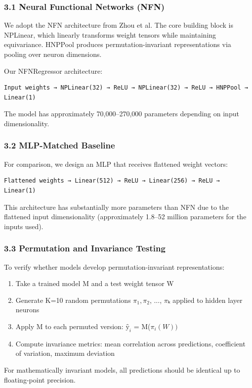 
\subsubsection{3.1 Neural Functional Networks (NFN)}

We adopt the NFN architecture from Zhou et al. The core building block is NPLinear, which linearly transforms weight tensors while maintaining equivariance. HNPPool produces permutation-invariant representations via pooling over neuron dimensions.

Our NFNRegressor architecture:
\begin{verbatim}
Input weights → NPLinear(32) → ReLU → NPLinear(32) → ReLU → HNPPool → Linear(1)
\end{verbatim}

The model has approximately 70,000--270,000 parameters depending on input dimensionality.

\subsubsection{3.2 MLP-Matched Baseline}

For comparison, we design an MLP that receives flattened weight vectors:
\begin{verbatim}
Flattened weights → Linear(512) → ReLU → Linear(256) → ReLU → Linear(1)
\end{verbatim}

This architecture has substantially more parameters than NFN due to the flattened input dimensionality (approximately 1.8--52 million parameters for the inputs used).

\subsubsection{3.3 Permutation and Invariance Testing}

To verify whether models develop permutation-invariant representations:

\begin{enumerate}
\item Take a trained model M and a test weight tensor W
\item Generate K=10 random permutations $\pi _1, \pi _2$, ..., $\pi$ₖ applied to hidden layer neurons
\item Apply M to each permuted version: $ŷ_i$ = M($\pi _{i}(W))$
\item Compute invariance metrics: mean correlation across predictions, coefficient of variation, maximum deviation
\end{enumerate}

For mathematically invariant models, all predictions should be identical up to floating-point precision.

